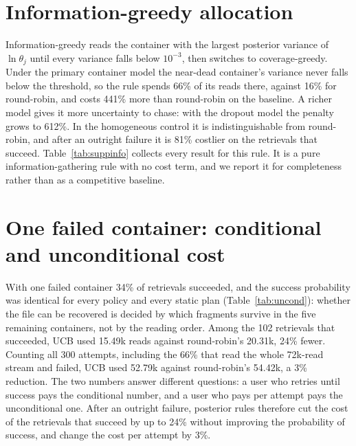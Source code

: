 \documentclass[conference,onecolumn,11pt]{IEEEtran}
\begin{document}
\section{Information-greedy allocation}\label{supp:info}
Information-greedy reads the container with the largest posterior variance of $\ln\theta_j$ until every
variance falls below $10^{-3}$, then switches to coverage-greedy.  Under the primary container model the
near-dead container's variance never falls below the threshold, so the rule spends 66\% of its reads
there, against 16\% for round-robin, and costs 441\% more than round-robin on the baseline.  A richer
model gives it more uncertainty to chase: with the dropout model the penalty grows to 612\%.  In the
homogeneous control it is indistinguishable from round-robin, and after an outright failure it is 81\%
costlier on the retrievals that succeed.  Table~\ref{tab:suppinfo} collects every result for this rule.
It is a pure information-gathering rule with no cost term, and we report it for completeness rather than
as a competitive baseline.


\section{One failed container: conditional and unconditional cost}\label{supp:uncond}

With one failed container 34\% of retrievals succeeded, and the success probability was identical for
every policy and every static plan (Table~\ref{tab:uncond}): whether the file can be recovered is decided
by which fragments survive in the five remaining containers, not by the reading order.  Among the 102
retrievals that succeeded, UCB used 15.49k reads against round-robin's 20.31k, 24\% fewer.  Counting all
300 attempts, including the 66\% that read the whole 72k-read stream and failed, UCB used 52.79k against
round-robin's 54.42k, a 3\% reduction.  The two numbers answer different questions: a user who retries
until success pays the conditional number, and a user who pays per attempt pays the unconditional one.
After an outright failure, posterior rules therefore cut the cost of the retrievals that succeed by up to
24\% without improving the probability of success, and change the cost per attempt by 3\%.

\end{document}
